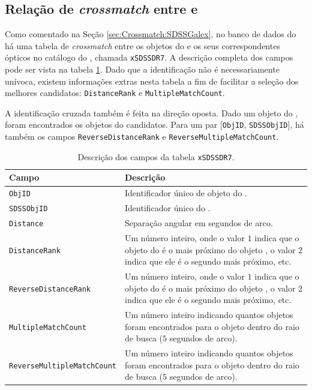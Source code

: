 \subsection{Relação de {\em crossmatch} entre \SDSS e \galex}
\label{sec:Crossmatch:DefAmostras:IdSDSSGalex}

Como comentado na Seção \ref{sec:Crossmatch:SDSSGalex}, no banco de dados do
\galex há uma tabela de {\em crossmatch} entre os objetos do \galex e os seus
correspondentes ópticos no catálogo do \SDSS, chamada \texttt{xSDSSDR7}. A
descrição completa dos campos pode ser vista na tabela \ref{tab:CamposXSDSSDR7}.
Dado que a identificação não é necessariamente unívoca, existem informações
extras nesta tabela a fim de facilitar a seleção dos melhores candidatos:
\texttt{DistanceRank} e \texttt{MultipleMatchCount}.

A identificação cruzada também é feita na direção oposta. Dado um objeto do
\SDSS, foram encontrados os objetos do \galex candidatos. Para um par
[\texttt{ObjID}, \texttt{SDSSObjID}], há também os campos
\texttt{ReverseDistanceRank} e \texttt{ReverseMultipleMatchCount}.

\begin{table}
	\caption[Descrição dos campos da tabela \texttt{xSDSSDR7}.]
	{Descrição dos campos da tabela \texttt{xSDSSDR7}.}
	\begin{tabular}{l p{8cm}}
		Campo & Descrição\\
		\midrule
		\texttt{ObjID} &
		Identificador único de objeto do \galex.
		\\
		\texttt{SDSSObjID} &
		Identificador único do \SDSS.
		\\
		\texttt{Distance} &
		Separação angular em segundos de arco.
		\\
		\texttt{DistanceRank} &
		Um número inteiro, onde o valor $1$ indica que o objeto do \galex é o
		mais próximo do objeto \SDSS, o valor $2$ indica que ele é o segundo mais
		próximo, etc.
		\\
		\texttt{ReverseDistanceRank} &
		Um número inteiro, onde o valor $1$ indica que o objeto do \SDSS é o mais
		próximo do objeto \galex, o valor $2$ indica que ele é o segundo mais
		próximo, etc.
		\\
		\texttt{MultipleMatchCount} &
		Um número inteiro indicando quantos objetos \SDSS foram encontrados para o
		objeto \galex dentro do raio de busca ($5$ segundos de arco).
		\\
		\texttt{ReverseMultipleMatchCount} &
		Um número inteiro indicando quantos objetos \galex foram encontrados para o
		objeto \SDSS dentro do raio de busca ($5$ segundos de arco).
		\\
	\end{tabular}
	\label{tab:CamposXSDSSDR7}
\end{table}

